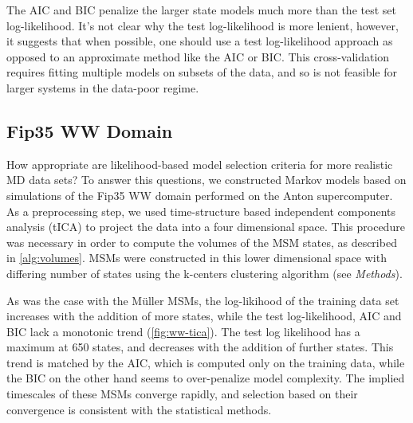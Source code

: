 \documentclass[journal=jpcbfk, layout=traditional, manuscript=article]{achemso}
\begin{document}
The AIC and BIC penalize the larger state models much more than the test set log-likelihood. It's not clear why the test log-likelihood is more lenient, however, it suggests that when possible, one should use a test log-likelihood approach as opposed to an approximate method like the AIC or BIC. This cross-validation requires fitting multiple models on subsets of the data, and so is not feasible for larger systems in the data-poor regime.

\subsection{Fip35 WW Domain}
How appropriate are likelihood-based model selection criteria for more realistic MD data sets? To answer this questions, we constructed Markov models based on simulations of the Fip35 WW domain\cite{Liu2008Experimental} performed on the Anton
supercomputer\cite{Shaw2010Atomic}. As a preprocessing step, we used time-structure based independent components analysis (tICA) to project the data into a four dimensional space. This procedure was necessary in order to compute the volumes of the MSM states, as described in \cref{alg:volumes}. MSMs were constructed in this lower dimensional space with differing number of states using the k-centers clustering algorithm (see \emph{Methods}).

As was the case with the M\"{u}ller MSMs, the log-likihood of the training data set increases with the addition of more states, while the test log-likelihood, AIC and BIC lack a monotonic trend (\cref{fig:ww-tica}). The test log likelihood has a maximum at 650 states, and decreases with the addition of further states. This trend is matched by the AIC, which is computed only on the training data, while the BIC on the other hand seems to over-penalize model complexity. The implied timescales of these MSMs converge rapidly, and selection based on their convergence is consistent with the statistical methods.
\end{document}
